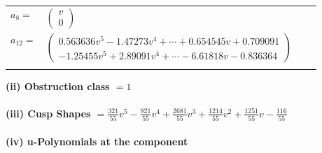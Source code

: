\documentclass[1p]{elsarticle_modified}
\theoremstyle{definition}
\begin{document}
\begin{tabular}{m{7pt} m{180pt} m{7pt} m{180pt} }
\flushright $a_{8}=$&$\begin{pmatrix}v\\0\end{pmatrix}$ \\
\flushright $a_{12}=$&$\begin{pmatrix}0.563636 v^{5}-1.47273 v^{4}+\cdots+0.654545 v+0.709091\\-1.25455 v^{5}+2.89091 v^{4}+\cdots-6.61818 v-0.836364\end{pmatrix}$\\&\end{tabular}
\flushleft \textbf{(ii) Obstruction class $= 1$}\\~\\
\flushleft \textbf{(iii) Cusp Shapes $= \frac{321}{55} v^5-\frac{821}{55} v^4+\frac{2681}{55} v^3+\frac{1214}{55} v^2+\frac{1251}{55} v-\frac{116}{55}$}\\~\\
\newpage\renewcommand{\arraystretch}{1}
\flushleft \textbf{(iv) u-Polynomials at the component}\newline \\
\end{document}
